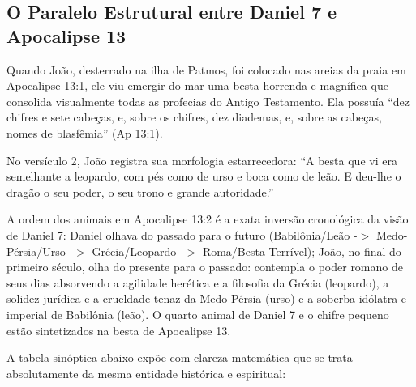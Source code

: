 \subsection{O Paralelo Estrutural entre Daniel 7 e Apocalipse 13}


Quando João, desterrado na ilha de Patmos, foi colocado nas areias da praia em Apocalipse 13:1, ele viu emergir do mar uma besta horrenda e magnífica que consolida visualmente todas as profecias do Antigo Testamento. Ela possuía ``dez chifres e sete cabeças, e, sobre os chifres, dez diademas, e, sobre as cabeças, nomes de blasfêmia'' (Ap 13:1).

No versículo 2, João registra sua morfologia estarrecedora: ``A besta que vi era semelhante a leopardo, com pés como de urso e boca como de leão. E deu-lhe o dragão o seu poder, o seu trono e grande autoridade.''

A ordem dos animais em Apocalipse 13:2 é a exata inversão cronológica da visão de Daniel 7: Daniel olhava do passado para o futuro (Babilônia/Leão -$>$ Medo-Pérsia/Urso -$>$ Grécia/Leopardo -$>$ Roma/Besta Terrível); João, no final do primeiro século, olha do presente para o passado: contempla o poder romano de seus dias absorvendo a agilidade herética e a filosofia da Grécia (leopardo), a solidez jurídica e a crueldade tenaz da Medo-Pérsia (urso) e a soberba idólatra e imperial de Babilônia (leão). O quarto animal de Daniel 7 e o chifre pequeno estão sintetizados na besta de Apocalipse 13.

A tabela sinóptica abaixo expõe com clareza matemática que se trata absolutamente da mesma entidade histórica e espiritual:


